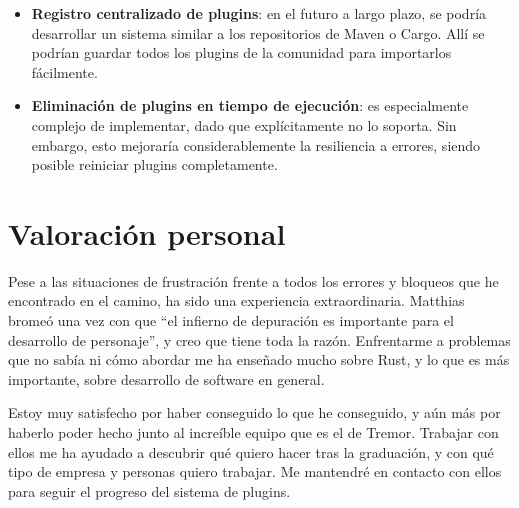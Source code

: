 \begin{itemize}
    \item \textbf{Registro centralizado de plugins}: en el futuro a largo plazo,
        se podría desarrollar un sistema similar a los repositorios de Maven o
        Cargo. Allí se podrían guardar todos los plugins de la comunidad para
        importarlos fácilmente.

    \item \textbf{Eliminación de plugins en tiempo de ejecución}: es
        especialmente complejo de implementar, dado que \abistable
        explícitamente no lo soporta. Sin embargo, esto mejoraría
        considerablemente la resiliencia a errores, siendo posible reiniciar
        plugins completamente.

\end{itemize}

\section{Valoración personal}

Pese a las situaciones de frustración frente a todos los errores y bloqueos que
he encontrado en el camino, ha sido una experiencia extraordinaria. Matthias
bromeó una vez con que ``el infierno de depuración es importante para el
desarrollo de personaje'', y creo que tiene toda la razón. Enfrentarme a
problemas que no sabía ni cómo abordar me ha enseñado mucho sobre Rust, y lo que
es más importante, sobre desarrollo de software en general.

Estoy muy satisfecho por haber conseguido lo que he conseguido, y aún más por
haberlo poder hecho junto al increíble equipo que es el de Tremor. Trabajar con
ellos me ha ayudado a descubrir qué quiero hacer tras la graduación, y con qué
tipo de empresa y personas quiero trabajar. Me mantendré en contacto con ellos
para seguir el progreso del sistema de plugins.
